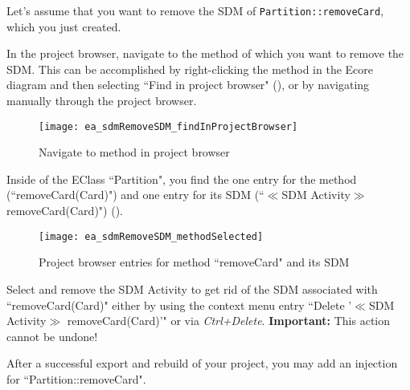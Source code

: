 Let's assume that you want to remove the SDM of \texttt{Partition::removeCard}, which you just created.

\begin{stepbystep}
\item
In the project browser, navigate to the method of which you want to remove the SDM.
This can be accomplished by right-clicking the method in the Ecore diagram and then selecting ``Find in project browser" (), or by navigating manually through the project browser.

\begin{figure}[htbp]
    \begin{center}
        \texttt{[image: ea\_sdmRemoveSDM\_findInProjectBrowser]}
        \caption{Navigate to method in project browser}  
        \label{ea:sdm_removeSDM_findInProjectBrowser}
    \end{center}
\end{figure}

\item
Inside of the EClass ``Partition", you find the one entry for the method (``removeCard(Card)") and one entry for its SDM (``$\ll$SDM Activity$\gg$ removeCard(Card)") ().

\begin{figure}[htbp]
    \begin{center}
        \texttt{[image: ea\_sdmRemoveSDM\_methodSelected]}
        \caption{Project browser entries for method ``removeCard" and its SDM}  
        \label{ea:sdm_removeSDM_methodSelected}
    \end{center}
\end{figure}

\item
Select and remove the SDM Activity to get rid of the SDM associated with ``removeCard(Card)" either by using the context menu entry ``Delete '$\ll$SDM Activity$\gg$ removeCard(Card)'" or via \emph{Ctrl+Delete}.
\textbf{Important:} This action cannot be undone!

\item
After a successful export and rebuild of your project, you may add an injection for ``Partition::removeCard".

\end{stepbystep}